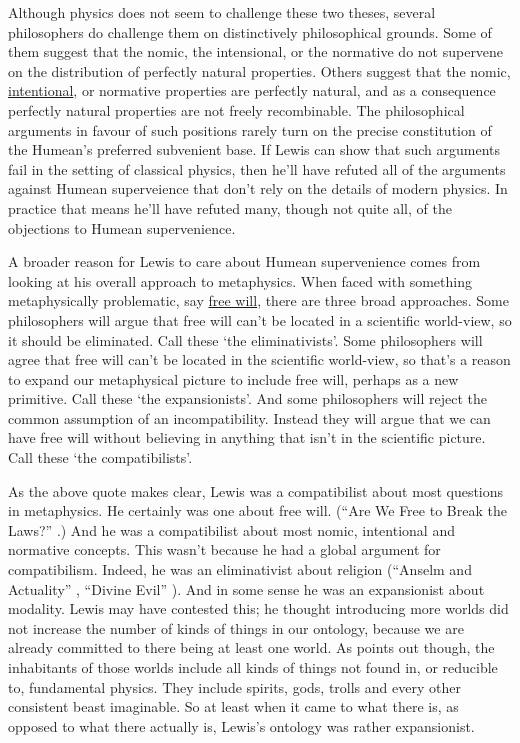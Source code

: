 Although physics does not seem to challenge these two theses, several philosophers do challenge them on distinctively philosophical grounds. Some of them suggest that the nomic, the intensional, or the normative do not supervene on the distribution of perfectly natural properties. Others suggest that the nomic, \href{http://plato.stanford.edu/intentionality/}{intentional}, or normative properties are perfectly natural, and as a consequence perfectly natural properties are not freely recombinable. The philosophical arguments in favour of such positions rarely turn on the precise constitution of the Humean's preferred subvenient base. If Lewis can show that such arguments fail in the setting of classical physics, then he'll have refuted all of the arguments against Humean superveience that don't rely on the details of modern physics. In practice that means he'll have refuted many, though not quite all, of the objections to Humean supervenience.

A broader reason for Lewis to care about Humean supervenience comes from looking at his overall approach to metaphysics. When faced with something metaphysically problematic, say \href{http://plato.stanford.edu/freewill/}{free will}, there are three broad approaches. Some philosophers will argue that free will can't be located in a scientific world-view, so it should be eliminated. Call these `the eliminativists'. Some philosophers will agree that free will can't be located in the scientific world-view, so that's a reason to expand our metaphysical picture to include free will, perhaps as a new primitive. Call these `the expansionists'. And some philosophers will reject the common assumption of an incompatibility. Instead they will argue that we can have free will without believing in anything that isn't in the scientific picture. Call these `the compatibilists'.

As the above quote makes clear, Lewis was a compatibilist about most questions in metaphysics. He certainly was one about free will. (``Are We Free to Break the Laws?'' \citeyearpar{Lewis1981a}.) And he was a compatibilist about most nomic, intentional and normative concepts. This wasn't because he had a global argument for compatibilism. Indeed, he was an eliminativist about religion (``Anselm and Actuality'' \citeyearpar{Lewis1970a}, ``Divine Evil'' \citeyearpar{Lewis2007}). And in some sense he was an expansionist about modality. Lewis may have contested this; he thought introducing more worlds did not increase the number of kinds of things in our ontology, because we are already committed to there being at least one world. As \cite[192]{Melia1992} points out though, the inhabitants of those worlds include all kinds of things not found in, or reducible to, fundamental physics. They include spirits, gods, trolls and every other consistent beast imaginable. So at least when it came to what there is, as opposed to what there actually is, Lewis's ontology was rather expansionist.

